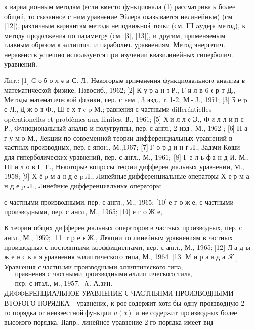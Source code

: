 \documentclass[10pt]{article}
\begin{document}
к вариационным методам (если вместо функционала (1) рассматривать более общий, то связанное с ним уравнение Эйлера оказывается нелинейным) (см. [12]), различным вариантам метода неподвижной точки (см. III ayдера метод), к методу продолжения по параметру (см. [3], [13]), и другим, применяемым главным образом к эллиптич. и параболич. уравнениям. Метод энергетич. неравенств успешно используется при изучении квазилинейных гиперболич. уравнений.



Лит.: [1] С о б о л е в С. Л., Некоторые применения функционального анализа в математической физике, Новосиб., 1962; [2] К у р а н т Р., Г и л в 6 е р т Д., Методы математической физики, пер. с нем., 3 изд., т. 1-2, М.- Ј., 1951; [3] Б е p с Л., Д ж о н Ф., Ш е х т e p М.; равнения с частными differéntielles opérationelles et problèmes aux limites, B., 1961; [5] Х и л л е Э., Ф и л л и п с Р., Функциональный анализ и полугруппы, пер. с англ., 2 изд., М., 1962 ; [6] Н а г у м о М., Лекции по современной теории дифференциальных уравнений в частных производных, пер. с япон., М.,1967; [7] Г о р д и н г Л., Задачи Коши для гиперболических уравнений, пер. с англ., М., $1961 ;$ [8] Г е л ь ф а н д И. М., III и л о в Г. Е., Некоторые вопросы теории дифференциальных уравнений, М., 1958; [9] X ё p м а н д е p Л., Линейные дифференциальные операторы Х е р м а н д е p Л., Линейные дифференциальные операторы

с частными производными, пер. с англ., М., 1965; [10] е г о ж е, с частными производными, пер. с англ., М., 1965; [10] е г о Ж е,

К теории общих дифференциальных операторов в частных производных, пер. с англ., М., 1959; [11] т р е в Ж., Лекции по линейным уравнениям в частных производных с постоянными коэффициентами, пер. с англ., М., 1965; [12] Л а д ы ж е н с к а я уравнения эллиптического типа, М., 1964; [13] М и р а н д а $\mathcal{K}_{\text {., }}$ Уравнения с частными производными әллиптического типа, $\begin{aligned} & \text { правнения с частными производными әллиптического тила, } \\ & \text { пер. с итал., м., 1957. } \text { A. А.зин. }\end{aligned}$ ДИФФЕРЕНЦИАЛЬНОЕ УРАВНЕНИЕ С ЧАСТНЫІМИ ПРОИЗВОДНЫМИ ВТОРОГО ПОРЯДКА - уравнение, к-рое содержит хотя бы одну производную 2-го порядка от неизвестной функции $u(x)$ и не содержит производных более высокого порядка. Напр., линейное уравнение 2-го порядка имеет вид
\end{document}
